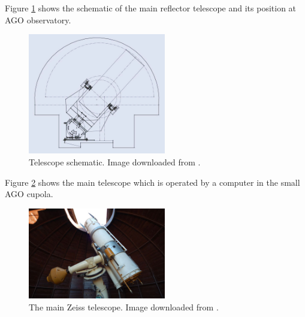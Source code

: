 	Figure \ref{fig:fmpiago1} shows the schematic of the main reflector telescope and its position at AGO observatory.
	
\begin{figure}[H]
  \centering
  \includegraphics[width=6cm]{images/FMPIAGO1}
  \caption{Telescope schematic. Image downloaded from \citep{kafzm}.}
  \label{fig:fmpiago1}
\end{figure}

	Figure \ref{fig:fmpiago2} shows the main telescope which is operated by a computer in the small AGO cupola.

\begin{figure}[H]
\centering
  \includegraphics[width=6cm]{images/FMPIAGO2}
  \caption{The main Zeiss telescope. Image downloaded from \citep{kafzm}.}
  \label{fig:fmpiago2}
\end{figure}